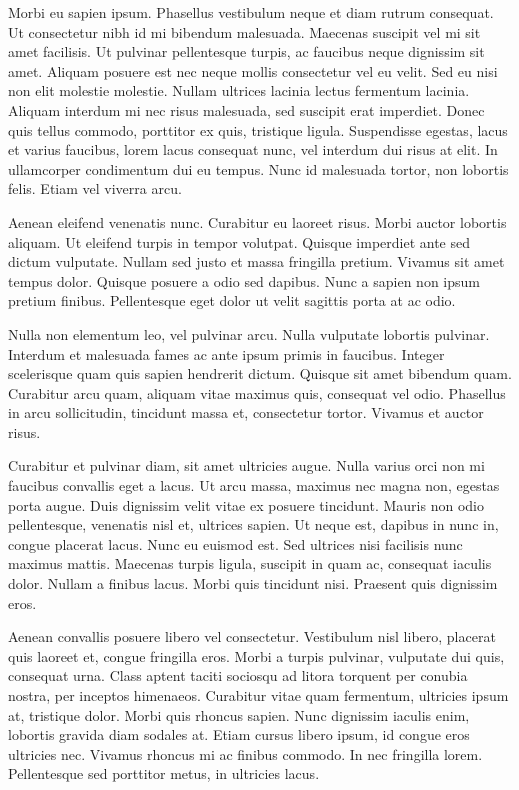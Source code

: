 \documentclass[12pt,a4paper]{article}
\begin{document}
Morbi eu sapien ipsum. Phasellus vestibulum neque et diam rutrum consequat. Ut consectetur nibh id mi bibendum malesuada. Maecenas suscipit vel mi sit amet facilisis. Ut pulvinar pellentesque turpis, ac faucibus neque dignissim sit amet. Aliquam posuere est nec neque mollis consectetur vel eu velit. Sed eu nisi non elit molestie molestie. Nullam ultrices lacinia lectus fermentum lacinia. Aliquam interdum mi nec risus malesuada, sed suscipit erat imperdiet. Donec quis tellus commodo, porttitor ex quis, tristique ligula. Suspendisse egestas, lacus et varius faucibus, lorem lacus consequat nunc, vel interdum dui risus at elit. In ullamcorper condimentum dui eu tempus. Nunc id malesuada tortor, non lobortis felis. Etiam vel viverra arcu.

Aenean eleifend venenatis nunc. Curabitur eu laoreet risus. Morbi auctor lobortis aliquam. Ut eleifend turpis in tempor volutpat. Quisque imperdiet ante sed dictum vulputate. Nullam sed justo et massa fringilla pretium. Vivamus sit amet tempus dolor. Quisque posuere a odio sed dapibus. Nunc a sapien non ipsum pretium finibus. Pellentesque eget dolor ut velit sagittis porta at ac odio.

Nulla non elementum leo, vel pulvinar arcu. Nulla vulputate lobortis pulvinar. Interdum et malesuada fames ac ante ipsum primis in faucibus. Integer scelerisque quam quis sapien hendrerit dictum. Quisque sit amet bibendum quam. Curabitur arcu quam, aliquam vitae maximus quis, consequat vel odio. Phasellus in arcu sollicitudin, tincidunt massa et, consectetur tortor. Vivamus et auctor risus.

Curabitur et pulvinar diam, sit amet ultricies augue. Nulla varius orci non mi faucibus convallis eget a lacus. Ut arcu massa, maximus nec magna non, egestas porta augue. Duis dignissim velit vitae ex posuere tincidunt. Mauris non odio pellentesque, venenatis nisl et, ultrices sapien. Ut neque est, dapibus in nunc in, congue placerat lacus. Nunc eu euismod est. Sed ultrices nisi facilisis nunc maximus mattis. Maecenas turpis ligula, suscipit in quam ac, consequat iaculis dolor. Nullam a finibus lacus. Morbi quis tincidunt nisi. Praesent quis dignissim eros.

Aenean convallis posuere libero vel consectetur. Vestibulum nisl libero, placerat quis laoreet et, congue fringilla eros. Morbi a turpis pulvinar, vulputate dui quis, consequat urna. Class aptent taciti sociosqu ad litora torquent per conubia nostra, per inceptos himenaeos. Curabitur vitae quam fermentum, ultricies ipsum at, tristique dolor. Morbi quis rhoncus sapien. Nunc dignissim iaculis enim, lobortis gravida diam sodales at. Etiam cursus libero ipsum, id congue eros ultricies nec. Vivamus rhoncus mi ac finibus commodo. In nec fringilla lorem. Pellentesque sed porttitor metus, in ultricies lacus.
\end{document}
